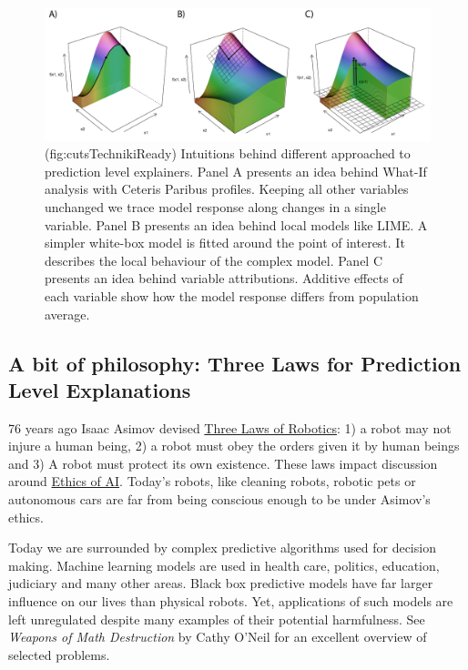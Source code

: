 \documentclass[]{krantz}
\theoremstyle{definition}
\theoremstyle{definition}
\theoremstyle{definition}
\theoremstyle{remark}
\begin{document}
\begin{figure}

{\centering \includegraphics[width=0.99\linewidth]{figure/cuts_techniki_ready} 

}

\caption{(fig:cutsTechnikiReady) Intuitions behind different approached to prediction level explainers. Panel A presents an idea behind What-If analysis with Ceteris Paribus profiles. Keeping all other variables unchanged we trace model response along changes in a single variable. Panel B presents an idea behind local models like LIME. A simpler white-box model is fitted around the point of interest. It describes the local behaviour of the complex model. Panel C presents an idea behind variable attributions. Additive effects of each variable show how the model response differs from population average.}\label{fig:cutsTechnikiReady}
\end{figure}

\hypertarget{three-single-laws}{%
\subsection{A bit of philosophy: Three Laws for Prediction Level
Explanations}\label{three-single-laws}}

76 years ago Isaac Asimov devised
\href{https://en.wikipedia.org/wiki/Three_Laws_of_Robotics}{Three Laws
of Robotics}: 1) a robot may not injure a human being, 2) a robot must
obey the orders given it by human beings and 3) A robot must protect its
own existence. These laws impact discussion around
\href{https://en.wikipedia.org/wiki/Ethics_of_artificial_intelligence}{Ethics
of AI}. Today's robots, like cleaning robots, robotic pets or autonomous
cars are far from being conscious enough to be under Asimov's ethics.

Today we are surrounded by complex predictive algorithms used for
decision making. Machine learning models are used in health care,
politics, education, judiciary and many other areas. Black box
predictive models have far larger influence on our lives than physical
robots. Yet, applications of such models are left unregulated despite
many examples of their potential harmfulness. See \emph{Weapons of Math
Destruction} by Cathy O'Neil \citep{ONeil} for an excellent overview of
selected problems.
\end{document}
